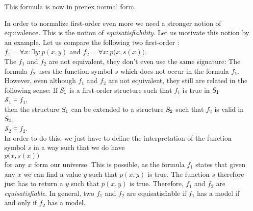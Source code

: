 This formula is now in prenex normal form.  

In order to normalize first-order \formulae even more we need a stronger notion of
equivalence.  This is the notion of \emph{equisatisfiability}.
Let us motivate this notion by an example.
Let us compare the following two first-order \formulae:
\\[0.2cm]
\hspace*{1.3cm} 
$f_1 = \forall x \colon \exists y \colon p(x,y)$ \quad and \quad 
$f_2 = \forall x \colon p\bigl(x,s(x)\bigr)$.
\\[0.2cm]
The \formulae $f_1$ and $f_2$ are not equivalent, they don't even use the same signature:
The formula  $f_2$ uses the function symbol $s$ which does not occur in the formula  $f_1$. 
However, even although  $f_1$ and $f_2$ are not equivalent, they still are related in the
following sense:  If $\textsl{S}_1$ is a first-order structure such that  $f_1$ is true in
$\textsl{S}_1$
\\[0.2cm]
\hspace*{1.3cm}
$\mathcal{S}_1 \models f_1$,
\\[0.2cm]
then the structure $\textsl{S}_1$ can be extended to a structure $\textsl{S}_2$ such that
$f_2$ is valid in $\textsl{S}_2$:
\\[0.2cm]
\hspace*{1.3cm}
$\mathcal{S}_2 \models f_2$.
\\[0.2cm]
In order to do this, we just have to define the interpretation of the function symbol
 $s$ in a way such that we do have
\\[0.2cm]
\hspace*{1.3cm}
$p\bigl(x,s(x)\bigr)$ 
\\[0.2cm]
for any  $x$ form our universe.  This is possible, as the formula 
$f_1$ states that given any $x$ we can find a value  $y$ such that 
$p(x,y)$ is true.   The function  $s$ therefore just has to return a $y$ such that
$p(x,y)$ is true.  Therefore, $f_1$ and $f_2$ are \emph{equisatisfiable}. 
In general, two \formulae $f_1$ and $f_2$ are equisatisfiable if $f_1$ has a model if and
only if $f_2$ has a model.
 


